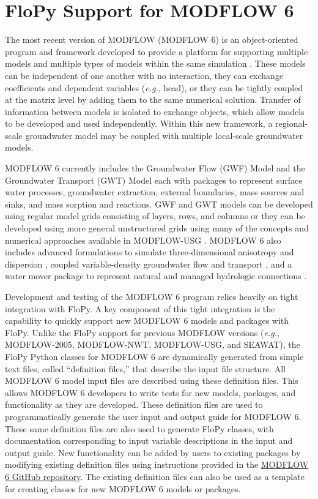 \documentclass[12pt, oneside]{article}  	%
\begin{document}
\section*{FloPy Support for MODFLOW 6}

The most recent version of MODFLOW (MODFLOW 6) is an object-oriented program and framework developed to provide a platform for supporting multiple models and multiple types of models within the same simulation \citep{modflow6framework}. These models can be independent of one another with no interaction, they can exchange coefficients and dependent variables (\textit{e.g.}, head), or they can be tightly coupled at the matrix level by adding them to the same numerical solution. Transfer of information between models is isolated to exchange objects, which allow models to be developed and used independently. Within this new framework, a regional-scale groundwater model may be coupled with multiple local-scale groundwater models. 

MODFLOW 6 currently includes the Groundwater Flow (GWF) Model and the Groundwater Transport (GWT) Model each with packages to represent surface water processes, groundwater extraction, external boundaries, mass sources and sinks, and mass sorption and reactions. GWF and GWT models can be developed using regular model grids consisting of layers, rows, and columns or they can be developed using more general unstructured grids using many of the concepts and numerical approaches available in MODFLOW-USG \citep{modflowusg}. MODFLOW 6 also includes advanced formulations to simulate three-dimensional anisotropy and dispersion \citep{modflow6xt3d}, coupled variable-density groundwater flow and transport \citep{langevin2020hydraulic}, and a water mover package to represent natural and managed hydrologic connections \citep{morway2021use}.

Development and testing of the MODFLOW 6 program relies heavily on tight integration with FloPy. A key component of this tight integration is the capability to quickly support new MODFLOW 6 models and packages with FloPy. Unlike the FloPy support for previous MODFLOW versions (\textit{e.g.}, MODFLOW-2005, MODFLOW-NWT, MODFLOW-USG, and SEAWAT), the FloPy Python classes for MODFLOW 6 are dynamically generated from simple text files, called ``definition files,'' that describe the input file structure. All MODFLOW 6 model input files are described using these definition files. This allows MODFLOW 6 developers to write tests for new models, packages, and functionality as they are developed. These definition files are used to programmatically generate the user input and output guide for MODFLOW 6. These same definition files are also used to generate FloPy classes, with documentation corresponding to input variable descriptions in the input and output guide. New functionality can be added by users to existing packages by modifying existing definition files using instructions provided in the \href{https://github.com/MODFLOW-USGS/modflow6/tree/develop/doc/mf6io/mf6ivar}{MODFLOW 6 GitHub repository}. The existing definition files can also be used as a template for creating classes for new MODFLOW 6 models or packages.
\end{document}
